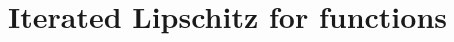 \documentclass{beamer}
\newcommand{\tallstrut}{\rule[-.5em]{0pt}{1.75em}}
\begin{document}
\section{Iterated Lipschitz for functions} 
\begin{Iterated Lipschitz conditions}
%
%
%
%
%
%
%
%
%
%
%
%

\end{Iterated Lipschitz conditions}
\end{document}
